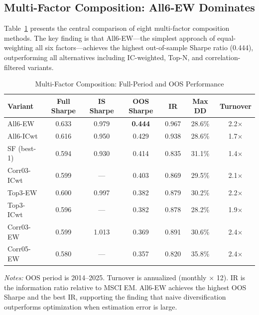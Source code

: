 \documentclass[12pt,a4paper]{article}
\begin{document}
\subsection{Multi-Factor Composition: All6-EW Dominates}

Table~\ref{tab:multifactor} presents the central comparison of eight multi-factor composition methods. The key finding is that All6-EW---the simplest approach of equal-weighting all six factors---achieves the highest out-of-sample Sharpe ratio (0.444), outperforming all alternatives including IC-weighted, Top-N, and correlation-filtered variants.

\begin{table}[H]
\centering
\caption{Multi-Factor Composition: Full-Period and OOS Performance}
\label{tab:multifactor}
\small
\begin{tabular}{lcccccc}
\toprule
\textbf{Variant} & \textbf{Full Sharpe} & \textbf{IS Sharpe} & \textbf{OOS Sharpe} & \textbf{IR} & \textbf{Max DD} & \textbf{Turnover} \\
\midrule
All6-EW     & 0.633 & 0.979 & \textbf{0.444} & 0.967 & 28.6\% & 2.2$\times$ \\
All6-ICwt   & 0.616 & 0.950 & 0.429 & 0.938 & 28.6\% & 1.7$\times$ \\
SF (best-1) & 0.594 & 0.930 & 0.414 & 0.835 & 31.1\% & 1.4$\times$ \\
Corr03-ICwt & 0.599 & ---   & 0.403 & 0.869 & 29.5\% & 2.1$\times$ \\
Top3-EW     & 0.600 & 0.997 & 0.382 & 0.879 & 30.2\% & 2.2$\times$ \\
Top3-ICwt   & 0.596 & ---   & 0.382 & 0.878 & 28.2\% & 1.9$\times$ \\
Corr03-EW   & 0.599 & 1.013 & 0.369 & 0.891 & 30.6\% & 2.4$\times$ \\
Corr05-EW   & 0.580 & ---   & 0.357 & 0.820 & 35.8\% & 2.4$\times$ \\
\bottomrule
\end{tabular}
\begin{minipage}{\textwidth}
\vspace{0.3em}
\footnotesize
\textit{Notes:} OOS period is 2014--2025. Turnover is annualized (monthly $\times$ 12). IR is the information ratio relative to MSCI EM. All6-EW achieves the highest OOS Sharpe and the best IR, supporting the \citet{demiguel2009} finding that naive diversification outperforms optimization when estimation error is large.
\end{minipage}
\end{table}
\end{document}
